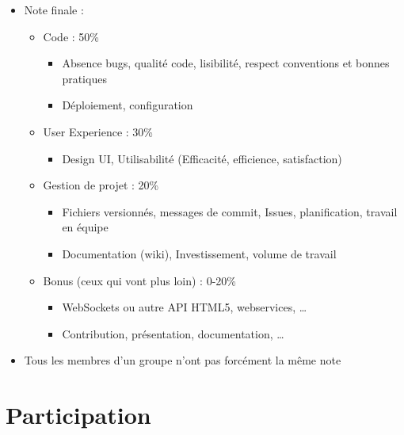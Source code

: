 \begin{itemize}
\tightlist
\item
  Note finale :

  \begin{itemize}
  \tightlist
  \item
    Code : 50\%

    \begin{itemize}
    \tightlist
    \item
      Absence bugs, qualité code, lisibilité, respect conventions et
      bonnes pratiques
    \item
      Déploiement, configuration
    \end{itemize}
  \item
    User Experience : 30\%

    \begin{itemize}
    \tightlist
    \item
      Design UI, Utilisabilité (Efficacité, efficience, satisfaction)
    \end{itemize}
  \item
    Gestion de projet : 20\%

    \begin{itemize}
    \tightlist
    \item
      Fichiers versionnés, messages de commit, Issues, planification,
      travail en équipe
    \item
      Documentation (wiki), Investissement, volume de travail
    \end{itemize}
  \item
    Bonus (ceux qui vont plus loin) : 0-20\%

    \begin{itemize}
    \tightlist
    \item
      WebSockets ou autre API HTML5, webservices, \ldots{}
    \item
      Contribution, présentation, documentation, \ldots{}
    \end{itemize}
  \end{itemize}
\item
  {Tous les membres d'un groupe n'ont pas forcément la même note}
\end{itemize}

\hypertarget{participation}{%
\section{Participation}\label{participation}}

